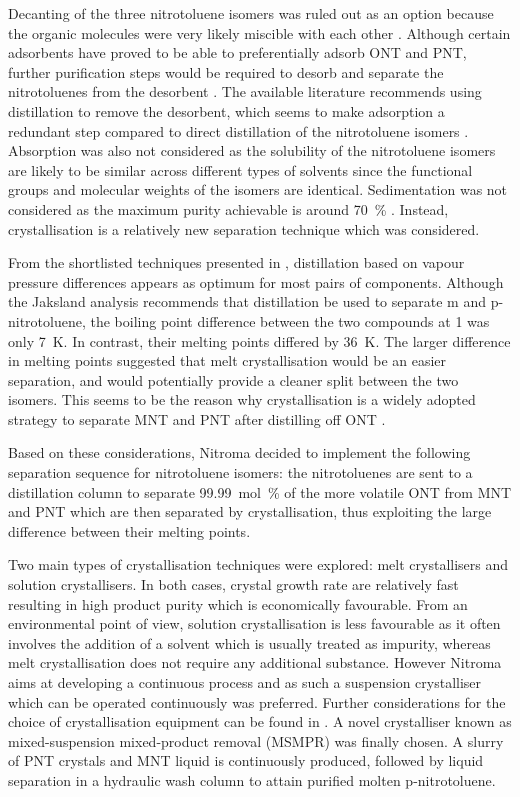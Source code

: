 Decanting of the three nitrotoluene isomers was ruled out as an option because the organic molecules were very likely miscible with each other \cite{merck_solvent_2021}. Although certain adsorbents have proved to be able to preferentially adsorb ONT and PNT, further purification steps would be required to desorb and separate the nitrotoluenes from the desorbent \cite{zhao_new_2016}. The available literature recommends using distillation to remove the desorbent, which seems to make adsorption a redundant step compared to direct distillation of the nitrotoluene isomers \cite{zinnen_ep0181106a2_1984}. Absorption was also not considered as the solubility of the nitrotoluene isomers are likely to be similar across different types of solvents since the functional groups and molecular weights of the isomers are identical. Sedimentation was not considered as the maximum purity achievable is around \SI{70}{\percent} \cite{seider_product_2009}. Instead, crystallisation is a relatively new separation technique which was considered. 

From the shortlisted techniques presented in , distillation based on vapour pressure differences appears as optimum for most pairs of components. Although the Jaksland analysis recommends that distillation be used to separate m and p-nitrotoluene, the boiling point difference between the two compounds at \SI{1}{\atm} was only \SI{7}{\K}. In contrast, their melting points differed by \SI{36}{\K}. The larger difference in melting points suggested that melt crystallisation would be an easier separation, and would potentially provide a cleaner split between the two isomers. This seems to be the reason why crystallisation is a widely adopted strategy to separate MNT and PNT after distilling off ONT \cite{weiland_purification_1931,european_chemical_agency_background_2010}. 

Based on these considerations, Nitroma decided to implement the following separation sequence for nitrotoluene isomers: the nitrotoluenes are sent to a distillation column to separate \SI{99.99}{mol\percent} of the more volatile ONT from MNT and PNT which are then separated by crystallisation, thus exploiting the large difference between their melting points.

Two main types of crystallisation techniques were explored: melt crystallisers and solution crystallisers. In both cases, crystal growth rate are relatively fast resulting in high product purity which is economically favourable. From an environmental point of view, solution crystallisation is less favourable as it often involves the addition of a solvent which is usually treated as impurity, whereas melt crystallisation does not require any additional substance. However Nitroma aims at developing a continuous process and as such a suspension crystalliser which can be operated continuously was preferred. Further considerations for the choice of crystallisation equipment can be found in . A novel crystalliser known as mixed-suspension mixed-product removal (MSMPR) was finally chosen. A slurry of PNT crystals and MNT liquid is continuously produced, followed by liquid separation in a hydraulic wash column to attain purified molten p-nitrotoluene. 

